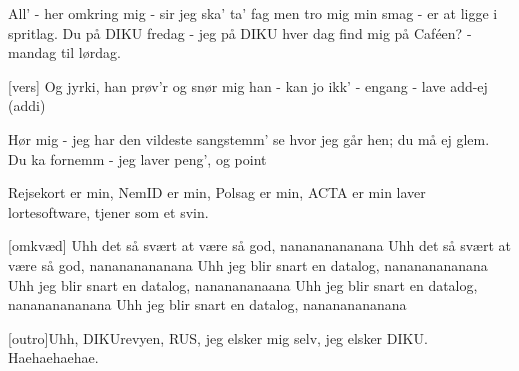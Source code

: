 \documentclass[a4paper,11pt]{article}
\begin{document}
\begin{song}
All' - her omkring mig - sir jeg ska' ta' fag
men tro mig min smag - er at ligge i spritlag.
Du på DIKU fredag - jeg på DIKU hver dag
find mig på Caféen? - mandag til lørdag.

[vers] Og jyrki, han prøv'r og snør mig
han - kan jo ikk' - engang - lave add-ej (addi)

Hør mig - jeg har den vildeste sangstemm'
se hvor jeg går hen; du må ej glem.
Du ka fornemm - jeg laver peng', og point

Rejsekort er min, NemID er min, Polsag er min, ACTA er min
laver lortesoftware, tjener som et svin.

[omkvæd] Uhh det så svært at være så god, nanananananana
Uhh det så svært at være så god, nanananananana
Uhh jeg blir snart en datalog, nanananananana
Uhh jeg blir snart en datalog, nananananaana
Uhh jeg blir snart en datalog, nanananananana
Uhh jeg blir snart en datalog, nanananananana

 [outro]Uhh, DIKUrevyen, RUS, jeg elsker mig selv, jeg elsker DIKU.
Haehaehaehae. 
\end{song}
\end{document}
